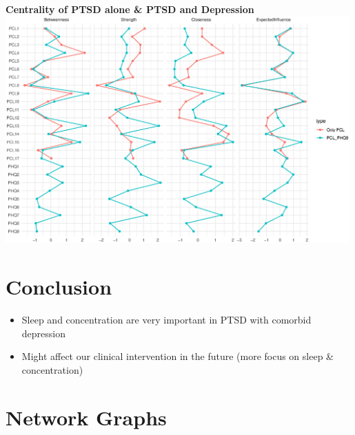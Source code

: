 \documentclass[]{betterposter}
\begin{document}
{\begin{center}
\textbf{Centrality of PTSD alone \& PTSD and Depression}
    \includegraphics[width=0.99\textwidth, height=0.7\textwidth]{img/centralityTotal.eps}
\end{center}

\section{Conclusion}
\begin{itemize}
    \item Sleep and concentration are very important in PTSD with comorbid depression
    \item Might affect our clinical intervention in the future (more focus on sleep \& concentration)
\end{itemize}

\vfill



}{


\section{Network Graphs}

}
\end{document}

